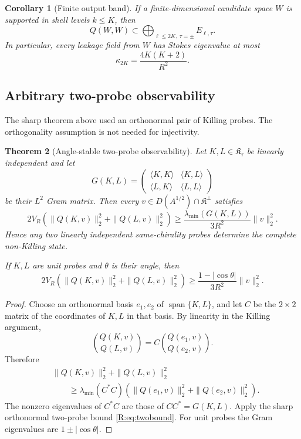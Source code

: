 \documentclass[
 aps,
 prd,
 reprint,
 amsmath,
 amssymb,
 nofootinbib,
 superscriptaddress
]{revtex4-2}
\newtheorem{theorem}{Theorem}[section]
\newtheorem{corollary}[theorem]{Corollary}
\theoremstyle{definition}
\theoremstyle{remark}
\begin{document}
\begin{corollary}[Finite output band]
\label{N:cor:finiteout}
If a finite-dimensional candidate space \(W\) is supported in shell levels
\(k\le K\), then
\[
 Q(W,W)
 \subset
 \bigoplus_{\ell\le2K,\ \tau=\pm}E_{\ell,\tau}.
\]
In particular, every leakage field from \(W\) has Stokes eigenvalue at most
\[
 \kappa_{2K}
 =
 \frac{4K(K+2)}{R^2}.
\]
\end{corollary}

\subsection{Arbitrary two-probe observability}

The sharp theorem above used an orthonormal pair of Killing probes.  The
orthogonality assumption is not needed for injectivity.

\begin{theorem}[Angle-stable two-probe observability]
\label{N:thm:angledpair}
Let \(K,L\in\mathfrak K_\tau\) be linearly independent and let
\[
 G(K,L)
 =
 \begin{pmatrix}
 \langle K,K\rangle&\langle K,L\rangle\\
 \langle L,K\rangle&\langle L,L\rangle
 \end{pmatrix}
\]
be their \(L^2\) Gram matrix.  Then every
\(v\in D(A^{1/2})\cap\mathfrak K^\perp\) satisfies
\begin{equation}
 \boxed{
 2V_R
 \left(
 \|Q(K,v)\|_2^2+\|Q(L,v)\|_2^2
 \right)
 \ge
 \frac{\lambda_{\min}(G(K,L))}{3R^2}
 \|v\|_2^2.
 }
 \label{N:eq:angledpair}
\end{equation}
Hence any two linearly independent same-chirality probes determine the
complete non-Killing state.

If \(K,L\) are unit probes and \(\theta\) is their angle, then
\begin{equation}
 2V_R
 \left(
 \|Q(K,v)\|_2^2+\|Q(L,v)\|_2^2
 \right)
 \ge
 \frac{1-|\cos\theta|}{3R^2}\|v\|_2^2.
 \label{N:eq:anglebound}
\end{equation}
\end{theorem}

\begin{proof}
Choose an orthonormal basis \(e_1,e_2\) of
\(\operatorname{span}\{K,L\}\), and let \(C\) be the \(2\times2\) matrix of
the coordinates of \(K,L\) in that basis.  By linearity in the Killing
argument,
\[
 \binom{Q(K,v)}{Q(L,v)}
 =
 C
 \binom{Q(e_1,v)}{Q(e_2,v)}.
\]
Therefore
\[
\begin{aligned}
 &\|Q(K,v)\|_2^2+\|Q(L,v)\|_2^2\\
 &\qquad\ge
 \lambda_{\min}(C^*C)
 \left(
 \|Q(e_1,v)\|_2^2+\|Q(e_2,v)\|_2^2
 \right).
\end{aligned}
\]
The nonzero eigenvalues of \(C^*C\) are those of
\(CC^*=G(K,L)\).  Apply the sharp orthonormal two-probe bound
\eqref{R:eq:twobound}.  For unit probes the Gram eigenvalues are
\(1\pm|\cos\theta|\).
\end{proof}
\end{document}

